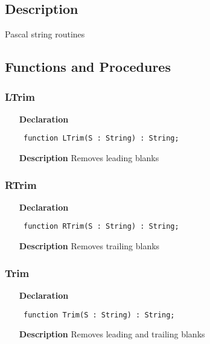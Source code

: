 \documentclass[12pt,a4paper,oneside]{report}
\newcommand{\declarationitem}[1]{\textbf{#1}}
\newcommand{\descriptiontitle}[1]{\textbf{#1}}
\newcommand{\code}[1]{\texttt{#1}}
\begin{document}
\subsection{Description}
Pascal string routines 
\subsection{Functions and Procedures}
\subsubsection{LTrim}
\label{ustrings-LTrim}
\begin{itemize}\item[\declarationitem{Declaration}\hfill]
	\begin{flushleft}
		\code{
			function LTrim(S : String) : String;}
		
	\end{flushleft}
	
	\par
	\item[\descriptiontitle{Description}]
	Removes leading blanks
	
\end{itemize}
\subsubsection{RTrim}
\label{ustrings-RTrim}
\begin{itemize}\item[\declarationitem{Declaration}\hfill]
	\begin{flushleft}
		\code{
			function RTrim(S : String) : String;}
		
	\end{flushleft}
	
	\par
	\item[\descriptiontitle{Description}]
	Removes trailing blanks
	
\end{itemize}
\subsubsection{Trim}
\label{ustrings-Trim}
\begin{itemize}\item[\declarationitem{Declaration}\hfill]
	\begin{flushleft}
		\code{
			function Trim(S : String) : String;}
		
	\end{flushleft}
	
	\par
	\item[\descriptiontitle{Description}]
	Removes leading and trailing blanks
	
\end{itemize}
\end{document}
